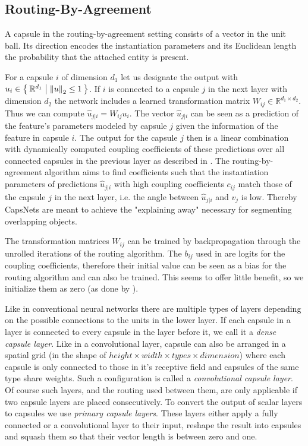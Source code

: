 \subsection{Routing-By-Agreement}

\newcommand{\uhat}{\hat{u}_{j \vert i}}

A capsule in the routing-by-agreement setting consists of a vector in the unit ball.
Its direction encodes the instantiation parameters and its Euclidean length the probability that the attached entity is present.

For a capsule $i$ of dimension $d_1$ let us designate the output with $u_i \in \Set{ \mathbb{R}^{d_1} | \left \lVert u \right \rVert _{2} \leq 1}$.
If $i$ is connected to a capsule $j$ in the next layer with dimension $d_2$ the network includes a learned transformation matrix $W_{ij} \in \mathbb{R}^{d_1 \times d_2}$.
Thus we can compute $\uhat = W_{ij} u_i$.
The vector $\uhat$ can be seen as a prediction of the feature's parameters modeled by capsule $j$ given the information of the feature in capsule $i$.
The output for the capsule $j$ then is a linear combination with dynamically computed coupling coefficients of these predictions over all connected capsules in the previous layer as described in .
The routing-by-agreement algorithm aims to find coefficients such that the instantiation parameters of predictions $\uhat$ with high coupling coefficients $c_{ij}$ match those of the capsule $j$ in the next layer, i.e. the angle between $\uhat$ and $v_j$ is low.
Thereby CapsNets are meant to achieve the "explaining away" necessary for segmenting overlapping objects.

The transformation matrices $W_{ij}$ can be trained by backpropagation through the unrolled iterations of the routing algorithm.
The $b_{ij}$ used in  are logits for the coupling coefficients, therefore their initial value can be seen as a bias for the routing algorithm and can also be trained.
This seems to offer little benefit, so we initialize them as zero (as done by \cite{capsules}).

Like in conventional neural networks there are multiple types of layers depending on the possible connections to the units in the lower layer.
If each capsule in a layer is connected to every capsule in the layer before it, we call it a \emph{dense capsule layer}.
Like in a convolutional layer, capsule can also be arranged in a spatial grid (in the shape of $height \times width \times types \times dimension$) where each capsule is only connected to those in it's receptive field and capsules of the same type share weights.
Such a configuration is called a \emph{convolutional capsule layer}.
Of course such layers, and the routing used between them, are only applicable if two capsule layers are placed consecutively.
To convert the output of scalar layers to capsules we use \emph{primary capsule layers}.
These layers either apply a fully connected or a convolutional layer to their input, reshape the result into capsules and squash them so that their vector length is between zero and one.

